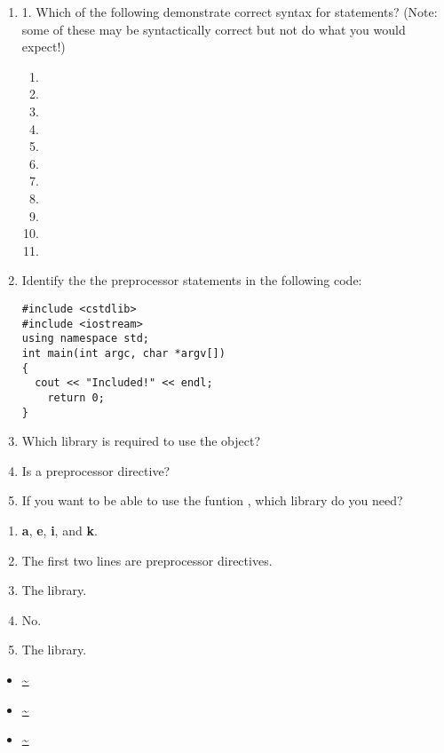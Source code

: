 \begin{enumerate}
	\item 1. Which of the following demonstrate correct syntax for  statements? (Note: some of these may be syntactically correct but not do what you would expect!)
	
	\begin{enumerate}
		\item {}
		\item {}
		\item {}
		\item {}
		\item {}
		\item {}
		\item {}
		\item {}
		\item {}
		\item {}
		\item {}
	\end{enumerate}
 
	\item Identify the the preprocessor statements in the following code:

\noindent\begin{minipage}{\linewidth}\begin{lstlisting}
#include <cstdlib>
#include <iostream>
using namespace std;
int main(int argc, char *argv[])
{
  cout << "Included!" << endl;
	return 0;
}
\end{lstlisting}\end{minipage}

  \item Which library is required to use the  object?
 
	\item Is  a preprocessor directive?
 
	\item If you want to be able to use the funtion , which library do you need?

\end{enumerate}


\begin{enumerate}
	\item \textbf{a}, \textbf{e}, \textbf{i}, and \textbf{k}.
	\item The first two lines are preprocessor directives.
	\item The  library.
	\item No.
	\item The  library.
\end{enumerate}


\begin{itemize}
\item \url{~}
\item \url{~}
\item \url{~}
\end{itemize}	



